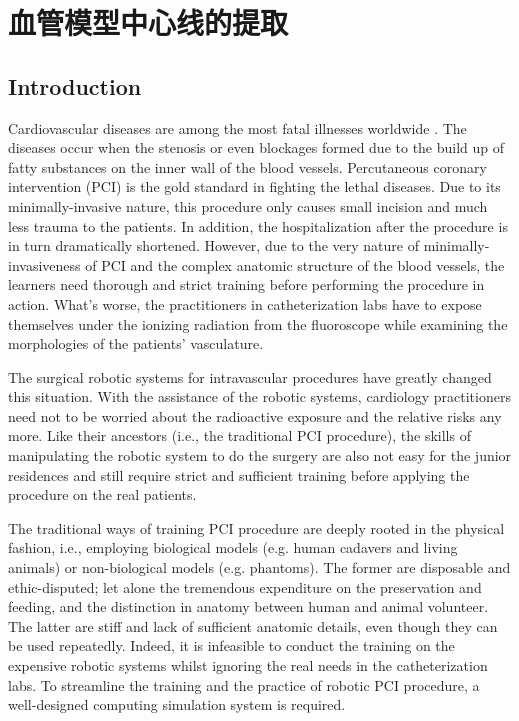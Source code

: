 \chapter{血管模型中心线的提取}
\label{chap7}

\section{Introduction}
Cardiovascular diseases are among the most fatal illnesses worldwide \cite{WHO2013}.
The diseases occur when the stenosis or even blockages formed due to the build up of fatty substances on the inner wall of the blood vessels.
Percutaneous coronary intervention (PCI) is the gold standard in fighting the lethal diseases.
Due to its minimally-invasive nature, this procedure only causes small incision and much less trauma to the patients.
In addition, the hospitalization after the procedure is in turn dramatically shortened.
However, due to the very nature of minimally-invasiveness of PCI and the complex anatomic structure of the blood vessels, the learners need thorough and strict training before performing the procedure in action. %
What's worse, the practitioners in catheterization labs have to expose themselves under the ionizing radiation from the fluoroscope while examining the morphologies of the patients' vasculature. %

The surgical robotic systems for intravascular procedures have greatly changed this situation.
With the assistance of the robotic systems, cardiology practitioners need not to be worried about the radioactive exposure and the relative risks any more.
Like their ancestors (i.e., the traditional PCI procedure), the skills of manipulating the robotic system to do the surgery are also not easy for the junior residences and still require strict and sufficient training before applying the procedure on the real patients. %

The traditional ways of training PCI procedure are deeply rooted in the physical fashion, i.e., employing biological models (e.g. human cadavers and living animals) or non-biological models (e.g. phantoms). %
The former are disposable and ethic-disputed; let alone the tremendous expenditure on the preservation and feeding, and the distinction in anatomy between human and animal volunteer. %
The latter are stiff and lack of sufficient anatomic details, even though they can be used repeatedly.
Indeed, it is infeasible to conduct the training on the expensive robotic systems whilst ignoring the real needs in the catheterization labs.
To streamline the training and the practice of robotic PCI procedure, a well-designed computing simulation system is required.

